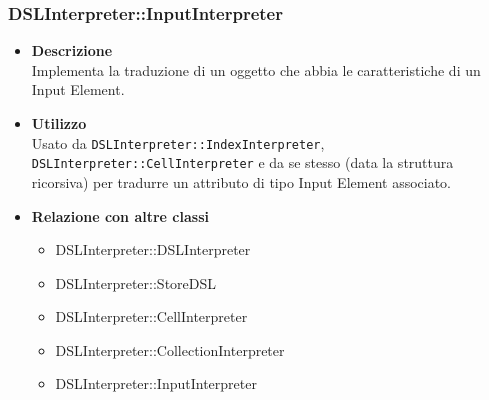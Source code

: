\subsubsection{DSLInterpreter::InputInterpreter}
\begin{itemize}
\item \textbf{Descrizione} \hfill \\
  Implementa la traduzione di un oggetto che abbia le caratteristiche di un Input Element.
\item \textbf{Utilizzo} \hfill \\
  Usato da \texttt{DSLInterpreter::IndexInterpreter}, \texttt{DSLInterpreter::CellInterpreter} e da se stesso (data la struttura ricorsiva) per tradurre un attributo di tipo Input Element associato.
\item \textbf{Relazione con altre classi}
  \begin{itemize}
  \item DSLInterpreter::DSLInterpreter
  \item DSLInterpreter::StoreDSL
  \item DSLInterpreter::CellInterpreter
  \item DSLInterpreter::CollectionInterpreter
  \item DSLInterpreter::InputInterpreter
  \end{itemize}
\end{itemize}
